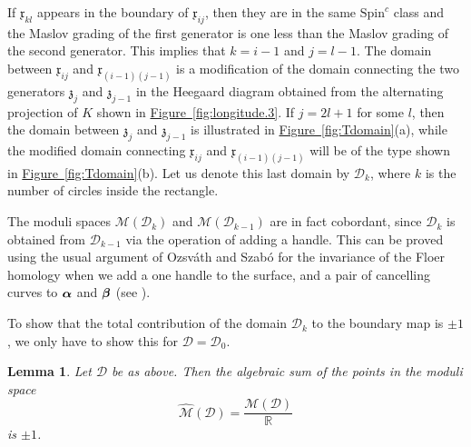 \documentclass{gtart_h}
\def\figref#1{\hyperlink{#1anchor}{Figure~\ref*{#1}}}
\newtheorem{lem}[thm]{Lemma}
\theoremstyle{definition}
\newcommand{\sD}{\mathcal{D}}
\newcommand\sM{\mathcal{M}}
\newcommand\alphas{\mbox{\boldmath$\alpha$}}
\newcommand\betas{\mbox{\boldmath$\beta$}}
\newcommand{\R}{\mathbb{R}}
\newcommand{\SpinC}{{\mathrm{Spin}}^c}
\begin{document}
If $\mathfrak{x}_{kl}$ appears in the boundary of $\mathfrak{x}_{ij}$, then they are
in the same $\SpinC$ class and the Maslov grading of the first generator is
one less than the Maslov grading
of the second generator. This implies that $k=i-1$ and $j=l-1$. The domain between
$\mathfrak{x}_{ij}$ and $\mathfrak{x}_{(i-1)(j-1)}$ is a modification of the domain
connecting the two generators $\mathfrak{z}_j$ and $\mathfrak{z}_{j-1}$ in the
Heegaard diagram obtained from the alternating projection of $K$ shown in
\figref{fig:longitude.3}. If $j=2l+1$ for some $l$, then the domain between
$\mathfrak{z}_j$ and $\mathfrak{z}_{j-1}$ is illustrated in \figref{fig:Tdomain}(a),
while the modified domain connecting $\mathfrak{x}_{ij}$ and $\mathfrak{x}_{(i-1)(j-1)}$
will be of the type shown in \figref{fig:Tdomain}(b). Let us denote this
last domain by
$\sD_k$, where $k$ is the number of circles inside the rectangle. 

The moduli spaces $\sM(\sD_k)$ and $\sM(\sD_{k-1})$ are in fact
cobordant, since $\sD_k$ is obtained from $\sD_{k-1}$ via the
operation of adding a handle. This can be proved using the usual
argument of Ozsv\'ath and Szab\'o for the invariance of the Floer
homology when we add a one handle to the surface, and a pair of
cancelling
curves to $\alphas$ and $\betas$ (see \cite{OS-3m1}).

To show that the total contribution of the domain $\sD_k$ to the boundary map is
$\pm 1$, we only have to show this for $\sD=\sD_0$.

\begin{lem}
Let $\sD$ be as above. Then the algebraic sum of the points in the moduli space
$$\widehat{\sM}(\sD)=\frac{\sM(\sD)}{\R}$$
is $\pm 1$.
\end{lem}
\end{document}
